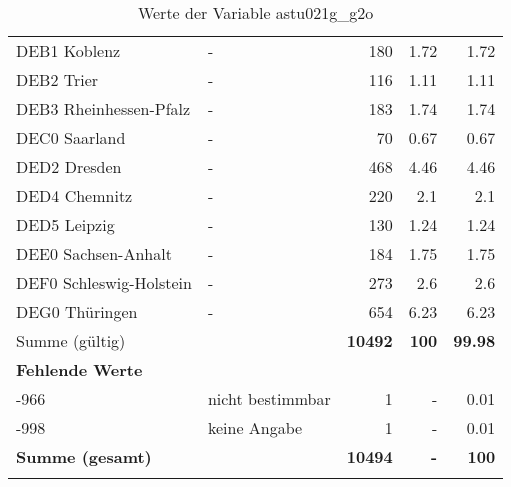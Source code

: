\begin{longtable}{Xlrrr}
        \multicolumn{1}{X}{DEB1 Koblenz} & - & \num{180} & \num[round-mode=places,round-precision=2]{1.72} & \num[round-mode=places,round-precision=2]{1.72} \\
        \multicolumn{1}{X}{DEB2 Trier} & - & \num{116} & \num[round-mode=places,round-precision=2]{1.11} & \num[round-mode=places,round-precision=2]{1.11} \\
        \multicolumn{1}{X}{DEB3 Rheinhessen-Pfalz} & - & \num{183} & \num[round-mode=places,round-precision=2]{1.74} & \num[round-mode=places,round-precision=2]{1.74} \\
        \multicolumn{1}{X}{DEC0 Saarland} & - & \num{70} & \num[round-mode=places,round-precision=2]{0.67} & \num[round-mode=places,round-precision=2]{0.67} \\
        \multicolumn{1}{X}{DED2 Dresden} & - & \num{468} & \num[round-mode=places,round-precision=2]{4.46} & \num[round-mode=places,round-precision=2]{4.46} \\
        \multicolumn{1}{X}{DED4 Chemnitz} & - & \num{220} & \num[round-mode=places,round-precision=2]{2.1} & \num[round-mode=places,round-precision=2]{2.1} \\
        \multicolumn{1}{X}{DED5 Leipzig} & - & \num{130} & \num[round-mode=places,round-precision=2]{1.24} & \num[round-mode=places,round-precision=2]{1.24} \\
        \multicolumn{1}{X}{DEE0 Sachsen-Anhalt} & - & \num{184} & \num[round-mode=places,round-precision=2]{1.75} & \num[round-mode=places,round-precision=2]{1.75} \\
        \multicolumn{1}{X}{DEF0 Schleswig-Holstein} & - & \num{273} & \num[round-mode=places,round-precision=2]{2.6} & \num[round-mode=places,round-precision=2]{2.6} \\
        \multicolumn{1}{X}{DEG0 Thüringen} & - & \num{654} & \num[round-mode=places,round-precision=2]{6.23} & \num[round-mode=places,round-precision=2]{6.23} \\
     \midrule
      \multicolumn{2}{l}{Summe (gültig)} & \textbf{\num{10492}} &
      \textbf{\num{100}} &
         \textbf{\num[round-mode=places,round-precision=2]{99.98}} \\
     \multicolumn{5}{l}{\textbf{Fehlende Werte}}\\
       -966 & nicht bestimmbar & \num{1} & - & \num[round-mode=places,round-precision=2]{0.01} \\

       -998 & keine Angabe & \num{1} & - & \num[round-mode=places,round-precision=2]{0.01} \\

     \midrule
     \multicolumn{2}{l}{\textbf{Summe (gesamt)}} & \textbf{\num{10494}} & \textbf{-} & \textbf{\num{100}} \\
     \bottomrule
     \caption{Werte der Variable astu021g\_g2o}
     \end{longtable}
     
